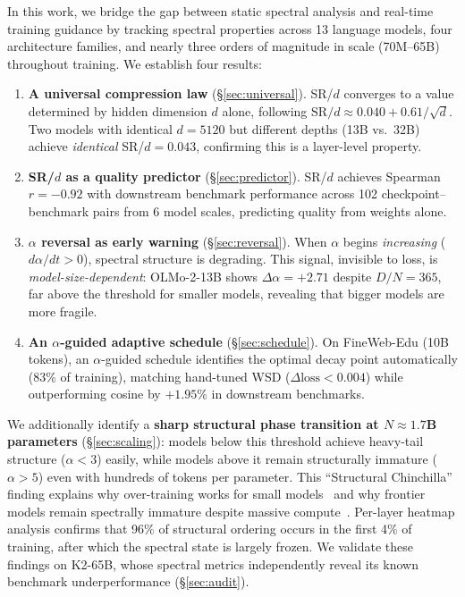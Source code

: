 In this work, we bridge the gap between static spectral analysis and real-time training guidance by tracking spectral properties across 13 language models, four architecture families, and nearly three orders of magnitude in scale (70M--65B) throughout training.
We establish four results:

\begin{enumerate}[leftmargin=*,itemsep=1pt,topsep=2pt]
    \item \textbf{A universal compression law} (\S\ref{sec:universal}). SR/$d$ converges to a value determined by hidden dimension $d$ alone, following $\mathrm{SR}/d \approx 0.040 + 0.61/\sqrt{d}$. Two models with identical $d = 5120$ but different depths (13B vs.\ 32B) achieve \emph{identical} SR/$d = 0.043$, confirming this is a layer-level property.

    \item \textbf{SR/$d$ as a quality predictor} (\S\ref{sec:predictor}). SR/$d$ achieves Spearman $r = -0.92$ with downstream benchmark performance across 102 checkpoint--benchmark pairs from 6 model scales, predicting quality from weights alone.

    \item \textbf{$\alpha$ reversal as early warning} (\S\ref{sec:reversal}). When $\alpha$ begins \emph{increasing} ($d\alpha/dt > 0$), spectral structure is degrading. This signal, invisible to loss, is \emph{model-size-dependent}: OLMo-2-13B shows $\Delta\alpha = +2.71$ despite $D/N = 365$, far above the threshold for smaller models, revealing that bigger models are more fragile.

    \item \textbf{An $\alpha$-guided adaptive schedule} (\S\ref{sec:schedule}). On FineWeb-Edu (10B tokens), an $\alpha$-guided schedule identifies the optimal decay point automatically (83\% of training), matching hand-tuned WSD ($\Delta\text{loss} < 0.004$) while outperforming cosine by $+1.95\%$ in downstream benchmarks.
\end{enumerate}

We additionally identify a \textbf{sharp structural phase transition at $N \approx 1.7$B parameters} (\S\ref{sec:scaling}): models below this threshold achieve heavy-tail structure ($\alpha < 3$) easily, while models above it remain structurally immature ($\alpha > 5$) even with hundreds of tokens per parameter. This ``Structural Chinchilla'' finding explains why over-training works for small models~\citep{gadre2024, muennighoff2023} and why frontier models remain spectrally immature despite massive compute~\citep{kaplan2020}. Per-layer heatmap analysis confirms that 96\% of structural ordering occurs in the first 4\% of training, after which the spectral state is largely frozen. We validate these findings on K2-65B, whose spectral metrics independently reveal its known benchmark underperformance (\S\ref{sec:audit}).

